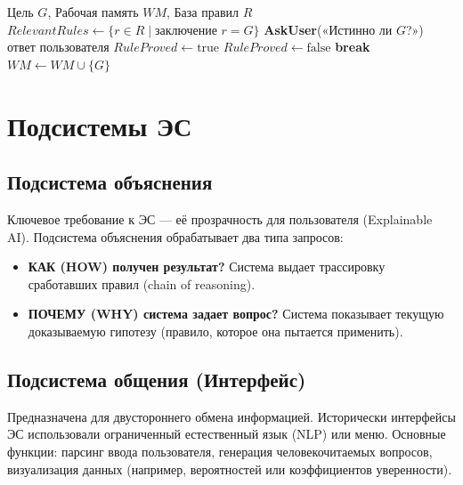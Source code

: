 \documentclass[12pt,a4paper]{article}
\begin{document}
\begin{algorithm}[H]
\caption{Алгоритм обратного логического вывода}
\begin{algorithmic}[1]
\Require Цель $G$, Рабочая память $WM$, База правил $R$
        \Return {}
    \EndIf
    \State $RelevantRules \gets \{r \in R \mid \text{заключение } r = G\}$
        \State \textbf{AskUser}(«Истинно ли $G$?») 
        \Return ответ пользователя
    \EndIf
        \State $RuleProved \gets \text{true}$
                \State $RuleProved \gets \text{false}$
                \State \textbf{break}
            \EndIf
        \EndFor
            \State $WM \gets WM \cup \{G\}$
            \Return {}
        \EndIf
    \EndFor
    \Return {}
\EndFunction
\end{algorithmic}
\end{algorithm}

\section{Подсистемы ЭС}

\subsection{Подсистема объяснения}
Ключевое требование к ЭС --- её прозрачность для пользователя (Explainable AI). Подсистема объяснения обрабатывает два типа запросов:
\begin{itemize}
    \item \textbf{КАК (HOW) получен результат?} Система выдает трассировку сработавших правил (chain of reasoning).
    \item \textbf{ПОЧЕМУ (WHY) система задает вопрос?} Система показывает текущую доказываемую гипотезу (правило, которое она пытается применить).
\end{itemize}

\subsection{Подсистема общения (Интерфейс)}
Предназначена для двустороннего обмена информацией. Исторически интерфейсы ЭС использовали ограниченный естественный язык (NLP) или меню. Основные функции: парсинг ввода пользователя, генерация человекочитаемых вопросов, визуализация данных (например, вероятностей или коэффициентов уверенности).
\end{document}
